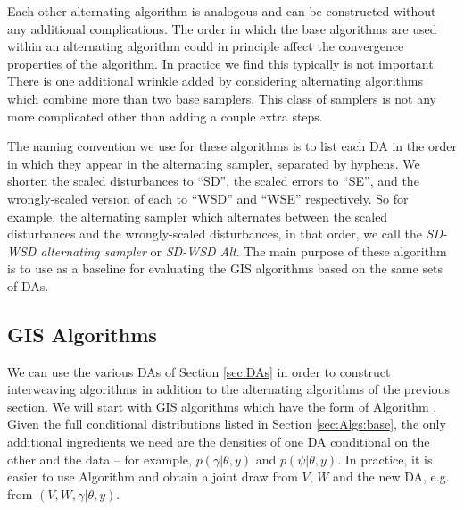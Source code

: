 \documentclass[12pt]{article}
\begin{document}
Each other alternating algorithm is analogous and can be constructed without any additional complications. The order in which the base algorithms are used within an alternating algorithm could in principle affect the convergence properties of the algorithm. In practice we find this typically is not important. There is one additional wrinkle added by considering alternating algorithms which combine more than two base samplers. This class of samplers is not any more complicated other than adding a couple extra steps. 


The naming convention we use for these algorithms is to list each DA in the order in which they appear in the alternating sampler, separated by hyphens. We shorten the scaled disturbances to ``SD'', the scaled errors to ``SE'', and the wrongly-scaled version of each to ``WSD'' and ``WSE'' respectively. So for example, the alternating sampler which alternates between the scaled disturbances and the wrongly-scaled disturbances, in that order, we call the {\it SD-WSD alternating sampler} or {\it SD-WSD Alt}. The main purpose of these algorithm is to use as a baseline for evaluating the GIS algorithms based on the same sets of DAs.

\subsection{GIS Algorithms}\label{sec:Algs:GIS}
We can use the various DAs of Section \ref{sec:DAs} in order to construct interweaving algorithms in addition to the alternating algorithms of the previous section. We will start with GIS algorithms which have the form of Algorithm . Given the full conditional distributions listed in Section \ref{sec:Algs:base}, the only additional ingredients we need are the densities of one DA conditional on the other and the data -- for example, $p(\gamma|\theta,y)$ and $p(\psi|\theta,y)$. In practice, it is easier to use Algorithm  and obtain a joint draw from $V$, $W$ and the new DA, e.g. from $(V,W,\gamma|\theta,y)$.
\end{document}
